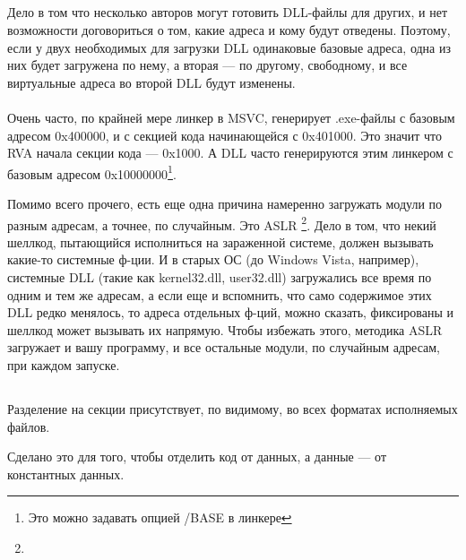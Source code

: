 \subsection{}
Дело в том что несколько авторов могут готовить DLL-файлы для других, и нет возможности договориться о том, какие адреса и кому будут отведены.
Поэтому, если у двух необходимых для загрузки DLL одинаковые базовые адреса, одна из них будет загружена по нему, а вторая --- по другому, свободному, и все виртуальные адреса во второй DLL будут изменены. \\
\\
Очень часто, по крайней мере линкер в \ac{MSVC}, генерирует .exe-файлы с базовым адресом 0x400000, и с секцией кода начинающейся с 0x401000. Это значит что \ac{RVA} начала секции кода --- 0x1000. 
А DLL часто генерируются этим линкером с базовым адресом 0x10000000\footnote{Это можно задавать опцией /BASE в линкере}.

Помимо всего прочего, есть еще одна причина намеренно загружать модули по разным адресам, а точнее, по случайным. 
Это \ac{ASLR}
\footnote{}.
Дело в том, что некий шеллкод, пытающийся исполниться на зараженной системе, должен вызывать какие-то системные ф-ции. И в старых ОС (до Windows Vista, например), системные DLL (такие как kernel32.dll, user32.dll) загружались все время
по одним и тем же адресам, а если еще и вспомнить, что само содержимое этих DLL редко менялось, то адреса отдельных
ф-ций, можно сказать, фиксированы и шеллкод может вызывать их напрямую. Чтобы избежать этого, методика \ac{ASLR} загружает
и вашу программу, и все остальные модули, по случайным адресам, при каждом запуске.

\subsection{}

Разделение на секции присутствует, по видимому, во всех форматах исполняемых файлов.

Сделано это для того, чтобы отделить код от данных, а данные --- от константных данных.

